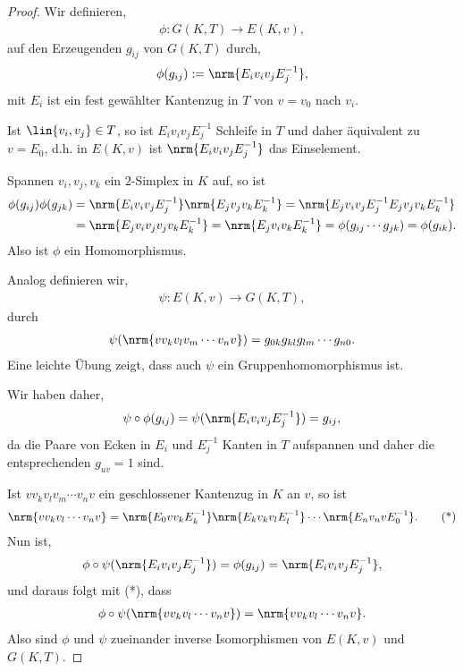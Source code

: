 \begin{proof}
Wir definieren,
\begin{align*}
\phi: G(K,T)\to E(K,v),
\end{align*}
auf den Erzeugenden $g_{ij}$ von $G(K,T)$ durch,
\begin{align*}
\phi(g_{ij}) := \nrm{E_i v_iv_j E_j^{-1}},
\end{align*}
mit $E_i$ ist ein fest gewählter Kantenzug in $T$ von $v=v_0$ nach $v_i$.

Ist $\lin{v_i,v_j}\in T$, so ist $E_iv_iv_jE_j^{-1}$ Schleife in $T$ und daher
äquivalent zu $v=E_0$, d.h. in $E(K,v)$ ist $\nrm{E_iv_iv_jE_j^{-1}}$ das
Einselement.

Spannen $v_i,v_j,v_k$ ein $2$-Simplex in $K$ auf, so ist
\begin{align*}
\phi(g_{ij})\phi(g_{jk}) &= \nrm{E_iv_iv_jE_j^{-1}}\nrm{E_jv_jv_kE_k^{-1}} =
\nrm{E_jv_iv_jE_j^{-1}E_jv_jv_kE_k^{-1}} \\ &=
\nrm{E_jv_iv_jv_jv_kE_k^{-1}} =
\nrm{E_jv_iv_kE_k^{-1}} = \phi(g_{ij}\cdots g_{jk}) = \phi(g_{ik}).  
\end{align*}
Also ist $\phi$ ein Homomorphismus.

Analog definieren wir,
\begin{align*}
\psi: E(K,v)\to G(K,T),
\end{align*}
durch
\begin{align*}
\psi(\nrm{vv_kv_lv_m\cdots v_n v}) = g_{0k}g_{kl}g_{lm}\cdots g_{n0}.
\end{align*}
Eine leichte Übung zeigt, dass auch $\psi$ ein Gruppenhomomorphismus ist.

Wir haben daher,
\begin{align*}
\psi\circ\phi(g_{ij}) = \psi(\nrm{E_iv_iv_jE_j^{-1}}) = g_{ij},
\end{align*}
da die Paare von Ecken in $E_i$ und $E_j^{-1}$ Kanten in $T$ aufspannen und
daher die entsprechenden $g_{uv}=1$ sind.

Ist $vv_kv_lv_m\cdots v_n v$ ein geschlossener Kantenzug in $K$ an $v$, so ist
\begin{align*}
\nrm{vv_kv_l\cdots v_nv} =
\nrm{E_0vv_kE_k^{-1}}\nrm{E_kv_kv_lE_l^{-1}}\cdots\nrm{E_nv_nvE_0^{-1}}.
\tag{*}
\end{align*}
Nun ist,
\begin{align*}
\phi\circ\psi(\nrm{E_iv_iv_jE_j^{-1}}) = \phi(g_{ij}) = \nrm{E_iv_iv_jE_j^{-1}},
\end{align*}
und daraus folgt mit (*), dass
\begin{align*}
\phi\circ\psi(\nrm{vv_kv_l\cdots v_nv}) = \nrm{vv_kv_l\cdots v_nv}.
\end{align*}
Also sind $\phi$ und $\psi$ zueinander inverse Isomorphismen von $E(K,v)$ und
$G(K,T)$.\qedhere
\end{proof}
